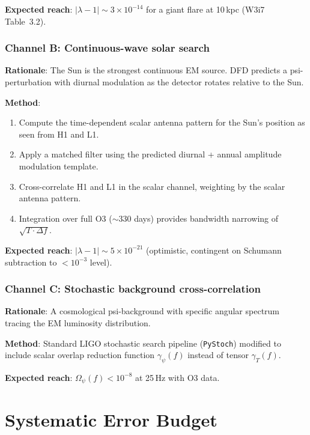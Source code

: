 \documentclass[11pt]{article}
\newcommand{\ee}[1]{\times 10^{#1}}
\newcommand{\lbone}{|\lambda - 1|}
\begin{document}
\textbf{Expected reach}: $\lbone \sim 3\ee{-14}$ for a giant flare
at 10\,kpc (W3i7 Table~3.2).

\subsubsection{Channel B: Continuous-wave solar search}

\textbf{Rationale}: The Sun is the strongest continuous EM source.
DFD predicts a psi-perturbation with diurnal modulation as the
detector rotates relative to the Sun.

\textbf{Method}:
\begin{enumerate}[nosep]
\item Compute the time-dependent scalar antenna pattern for the Sun's
  position as seen from H1 and L1.
\item Apply a matched filter using the predicted diurnal + annual
  amplitude modulation template.
\item Cross-correlate H1 and L1 in the scalar channel, weighting
  by the scalar antenna pattern.
\item Integration over full O3 ($\sim$330 days) provides bandwidth
  narrowing of $\sqrt{T \cdot \Delta f}$.
\end{enumerate}

\textbf{Expected reach}: $\lbone \sim 5\ee{-21}$ (optimistic,
contingent on Schumann subtraction to $<10^{-3}$ level).

\subsubsection{Channel C: Stochastic background cross-correlation}

\textbf{Rationale}: A cosmological psi-background with specific
angular spectrum tracing the EM luminosity distribution.

\textbf{Method}: Standard LIGO stochastic search pipeline
(\texttt{PyStoch}) modified to include scalar overlap reduction
function $\gamma_\psi(f)$ instead of tensor $\gamma_T(f)$.

\textbf{Expected reach}: $\Omega_\psi(f) < 10^{-8}$ at 25\,Hz
with O3 data.

\section{Systematic Error Budget}
\end{document}

